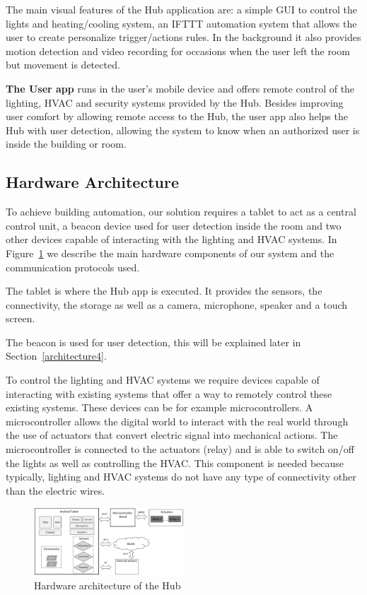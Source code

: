 \documentclass[conference]{IEEEtran}
\begin{document}
The main visual features of the Hub application are: a simple \ac{GUI} to control the lights and heating/cooling system, an \ac{IFTTT} automation system that allows the user to create personalize trigger/actions rules. In the background it also provides motion detection and video recording for occasions when the user left the room but movement is detected.

\textbf{The User app} runs in the user's mobile device and offers remote control of the lighting, \ac{HVAC} and security systems provided by the Hub. Besides improving user comfort by allowing remote access to the Hub, the user app also helps the Hub with user detection, allowing the system to know when an authorized user is inside the building or room.

\subsection{Hardware Architecture}

To achieve building automation, our solution requires a tablet to act as a central control unit, a beacon device used for user detection inside the room and two other devices capable of interacting with the lighting and \ac{HVAC} systems. In Figure~\ref{hard_architecture_system} we describe the main hardware components of our system and the communication protocols used.

The tablet is where the Hub app is executed. It provides the sensors, the connectivity, the storage as well as a camera, microphone, speaker and a touch screen. 

The beacon is used for user detection, this will be explained later in Section~\ref{architecture4}.

To control the lighting and \ac{HVAC} systems we require devices capable of interacting with existing systems that offer a way to remotely control these existing systems. These devices can be for example microcontrollers. A microcontroller allows the digital world to interact with the real world through the use of actuators that convert electric signal into mechanical actions. The microcontroller is connected to the actuators (relay) and is able to switch on/off the lights as well as controlling the HVAC. This component is needed because typically, lighting and HVAC systems do not have any type of connectivity other than the electric wires. 

\begin{figure}[h]
\centering
\includegraphics[width=0.5\textwidth]{Figures/arch_hardware}
\caption{Hardware architecture of the Hub}
\label{hard_architecture_system}
\end{figure}
\end{document}
